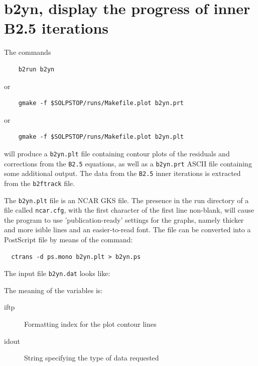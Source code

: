 \documentclass[a4paper,10pt]{report}
\begin{document}
\newpage
\section{b2yn, display the progress of inner B2.5 iterations}
\label{sec:b2yn}

The commands
\begin{verbatim}
    b2run b2yn
\end{verbatim}
or
\begin{verbatim}
    gmake -f $SOLPSTOP/runs/Makefile.plot b2yn.prt
\end{verbatim}
or
\begin{verbatim}
    gmake -f $SOLPSTOP/runs/Makefile.plot b2yn.plt
\end{verbatim}
will produce a {\tt b2yn.plt} file containing contour plots of the residuals
and corrections from the {\tt B2.5} equations,
as well as a {\tt b2yn.prt} ASCII file containing some additional output.
The data from the {\tt B2.5} inner iterations is extracted from the {\tt b2ftrack} file.

The {\tt b2yn.plt} file is an NCAR GKS file. The presence in the run directory of a file
called {\tt ncar.cfg}, with the first character of the first line non-blank, will cause
the program to use 'publication-ready' settings for the graphs, namely thicker and more
isible lines and an easier-to-read font. The file can be converted into
a PostScript file by means of the command:
\begin{verbatim}
  ctrans -d ps.mono b2yn.plt > b2yn.ps
\end{verbatim}

The input file {\tt b2yn.dat} looks like:

The meaning of the variables is:
\begin{description}
  \item[iftp] Formatting index for the plot contour lines
  \item[idout] String specifying the type of data requested
\end{description}
\end{document}
